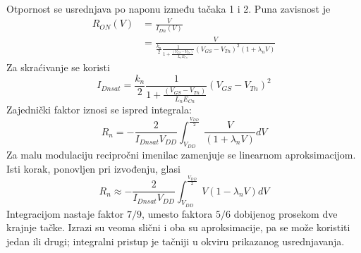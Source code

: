 Otpornost se usrednjava po naponu između tačaka 1 i 2. Puna zavisnost je
\[\begin{aligned}R_{ON}(V)&=\frac V{I_{Dn}(V)}\\&=\frac V{\frac{k_n}{2}\frac1{1+\frac{(V_{GS}-V_{Tn})}{L_nE_{Cn}}}(V_{GS}-V_{Tn})^2(1+\lambda_nV)}\end{aligned}\]
Za skraćivanje se koristi
\[I_{Dnsat}=\frac{k_n}{2}\frac1{1+\frac{(V_{GS}-V_{Tn})}{L_nE_{Cn}}}(V_{GS}-V_{Tn})^2\]
Zajednički faktor iznosi se ispred integrala:
\[R_n=-\frac2{I_{Dnsat}V_{DD}}\int_{V_{DD}}^{\frac{V_{DD}}2}\frac V{(1+\lambda_nV)}dV\]
Za malu modulaciju recipročni imenilac zamenjuje se linearnom aproksimacijom. Isti korak, ponovljen pri izvođenju, glasi
\[R_n\approx-\frac2{I_{Dnsat}V_{DD}}\int_{V_{DD}}^{\frac{V_{DD}}2}V(1-\lambda_nV)dV\]
Integracijom nastaje faktor $7/9$, umesto faktora $5/6$ dobijenog prosekom dve krajnje tačke. Izrazi su veoma slični i oba su aproksimacije, pa se može koristiti jedan ili drugi; integralni pristup je tačniji u okviru prikazanog usrednjavanja.

